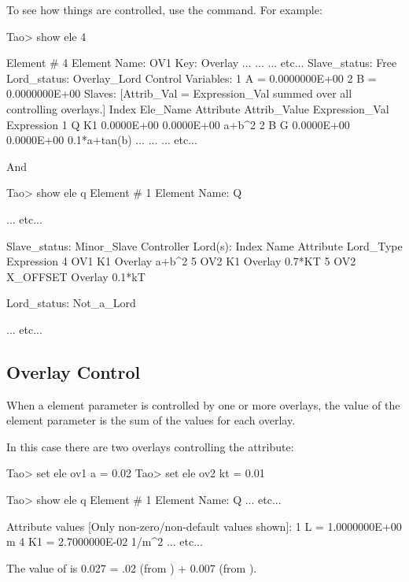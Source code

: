 \documentclass{hitec}
\begin{document}
To see how things are controlled, use the  command. For example:
{\small
\begin{code}
Tao> show ele 4

 Element #                4
 Element Name: OV1
 Key: Overlay
... ... ... etc...
Slave_status: Free
Lord_status:  Overlay_Lord
Control Variables:
    1   A                                         =  0.0000000E+00
    2   B                                         =  0.0000000E+00
Slaves: [Attrib_Val = Expression_Val summed over all controlling overlays.]
   Index   Ele_Name  Attribute   Attrib_Value  Expression_Val    Expression
       1   Q         K1            0.0000E+00      0.0000E+00    a+b^2
       2   B         G             0.0000E+00      0.0000E+00    0.1*a+tan(b)
... ... ... etc...
\end{code}}

And

{\small
\begin{code}
Tao> show ele q
 Element #                1
 Element Name: Q

        ... etc...

Slave_status: Minor_Slave
Controller Lord(s):
   Index   Name        Attribute           Lord_Type           Expression
       4   OV1         K1                  Overlay             a+b^2
       5   OV2         K1                  Overlay             0.7*KT
       5   OV2         X_OFFSET            Overlay             0.1*kT

Lord_status:  Not_a_Lord

        ... etc...
\end{code}}

\subsection{Overlay Control}

When a element parameter is controlled by one or more overlays, the value of the element parameter
is the sum of the values for each overlay.

In this case there are two overlays controlling the  attribute:
{\small
\begin{code}
Tao> set ele ov1 a = 0.02
Tao> set ele ov2 kt = 0.01

Tao> show ele q
 Element #                1
 Element Name: Q
... etc...

 Attribute values [Only non-zero/non-default values shown]:
    1   L                            =  1.0000000E+00 m
    4   K1                           =  2.7000000E-02 1/m^2
... etc...
\end{code}}
The value of  is 0.027 = .02 (from ) + 0.007 (from ).
\end{document}
